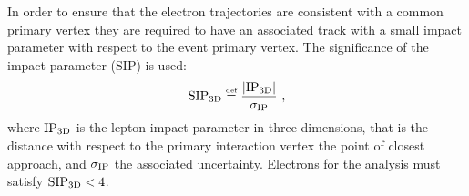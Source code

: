 In order to ensure that the electron trajectories are consistent with a common primary vertex
they are required to have an associated track with a small impact parameter with respect to the event primary vertex.
The significance of the impact parameter (SIP) is used:
\begin{equation}
\label{eq:SIP3D}
\SIPthreeD \mathdefined \frac{|\rm IP_{3D}|}{\sigma_{\rm IP}} \ ,
\end{equation}
where ${\rm IP_{3D}}$ is the lepton impact parameter in three dimensions,
that is the distance with respect to the primary interaction vertex the point of closest approach,
and $\sigma_{\rm IP}$ the associated uncertainty.
Electrons for the analysis must satisfy $\mathrm{SIP}_{\mathrm{3D}} < 4$.
